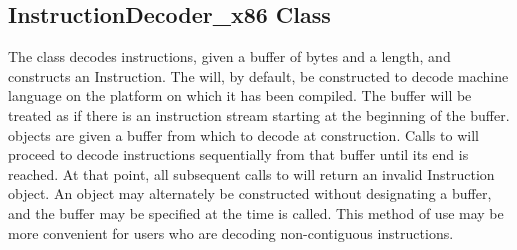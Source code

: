 \subsection{InstructionDecoder\_x86 Class}
\label{sec:instructionDecoder}

The  class decodes instructions, given a buffer of bytes and a
length, and constructs an Instruction. The  will, by default,
be constructed to decode machine language on the platform on which it has been
compiled. The buffer will be treated as if there is an instruction stream
starting at the beginning of the buffer.  objects are given a
buffer from which to decode at construction. Calls to  will
proceed to decode instructions sequentially from that buffer until its end is
reached. At that point, all subsequent calls to  will return
an invalid Instruction object. An  object may alternately be
constructed without designating a buffer, and the buffer may be specified at the
time  is called. This method of use may be more convenient for
users who are decoding non-\/contiguous instructions.
